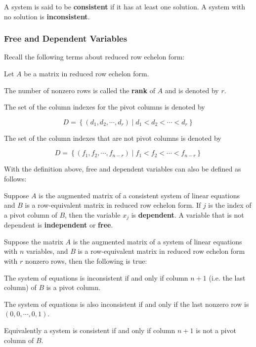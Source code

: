 \documentclass[a4paper,12pt]{article}
\begin{document}
\begin{dft}
  A system is said to be \textbf{consistent} if it has at least one solution. A system with no solution is \textbf{inconsistent}.
\end{dft}\n

\subsubsection{Free and Dependent Variables}
Recall the following terms about reduced row echelon form:\n

\begin{dft}
  Let $A$ be a matrix in reduced row echelon form.
  \begin{alist}
    \item The number of nonzero rows is called the \textbf{rank} of $A$ and is denoted by $r$.
    \item The set of the column indexes for the pivot columns is denoted by

    $$D=\left\{ (d_{1},d_{2},\cdots,d_{r})\mid d_{1}<d_{2}<\cdots<d_{r}\right\}$$

    \item The set of the column indexes that are not pivot columns is denoted by

    $$D=\left\{ (f_{1},f_{2},\cdots,f_{n-r})\mid f_{1}<f_{2}<\cdots<f_{n-r}\right\}$$
  \end{alist}
\end{dft}\n

With the definition above, free and dependent variables can also be defined as follows:\n

\begin{dft}
  Suppose $A$ is the augmented matrix of a consistent system of linear equations and $B$ is a row-equivalent matrix in reduced row echelon form. If $j$ is the index of a pivot column of $B$, then the variable $x_{j}$ is \textbf{dependent}. A variable that is not dependent is \textbf{independent} or \textbf{free}.
\end{dft}\n

\begin{thm}
  Suppose the matrix $A$ is the augmented matrix of a system of linear equations with $n$ variables, and $B$ is a row-equivalent matrix in reduced row echelon form with $r$ nonzero rows, then the following is true:

  \begin{alist}
    \item The system of equations is inconsistent if and only if column $n+1$ (i.e. the last column) of $B$ is a pivot column.
    \item The system of equations is also inconsistent if and only if the last nonzero row is $(0,0,\cdots,0,1)$.
    \item Equivalently a system is consistent if and only if column $n+1$ is not a pivot column of $B$.
  \end{alist}
\end{thm}
\end{document}
